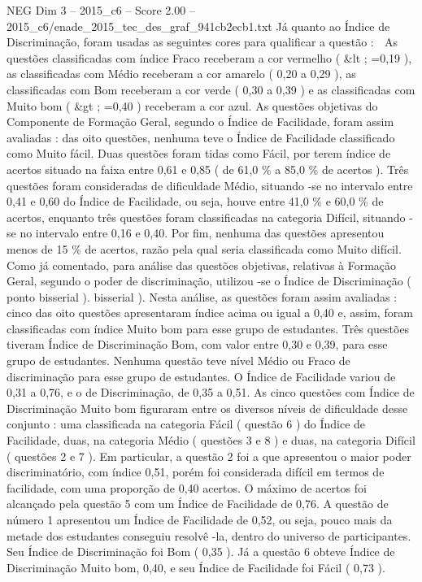 \begin{textsample}{NEG Dim 3 – 2015\_c6 – Score 2.00 – 2015\_c6/enade\_2015\_tec\_des\_graf\_941cb2ecb1.txt}
Já quanto ao Índice de Discriminação, foram usadas as seguintes cores para qualificar a questão :  As questões classificadas com índice Fraco receberam a cor vermelho ( \&lt ; =0,19 ), as classificadas com Médio receberam a cor amarelo ( 0,20 a 0,29 ), as classificadas com Bom receberam a cor verde ( 0,30 a 0,39 ) e as classificadas com Muito bom ( \&gt ; =0,40 ) receberam a cor azul.
As questões objetivas do Componente de Formação Geral, segundo o Índice de Facilidade, foram assim avaliadas : das oito questões, nenhuma teve o Índice de Facilidade classificado como Muito fácil.
Duas questões foram tidas como Fácil, por terem índice de acertos situado na faixa entre 0,61 e 0,85 ( de 61,0 \% a 85,0 \% de acertos ).
Três questões foram consideradas de dificuldade Médio, situando -se no intervalo entre 0,41 e 0,60 do Índice de Facilidade, ou seja, houve entre 41,0 \% e 60,0 \% de acertos, enquanto três questões foram classificadas na categoria Difícil, situando -se no intervalo entre 0,16 e 0,40.
Por fim, nenhuma das questões apresentou menos de 15 \% de acertos, razão pela qual seria classificada como Muito difícil.
Como já comentado, para análise das questões objetivas, relativas à Formação Geral, segundo o poder de discriminação, utilizou -se o Índice de Discriminação ( ponto bisserial ). bisserial ).
Nesta análise, as questões foram assim avaliadas : cinco das oito questões apresentaram índice acima ou igual a 0,40 e, assim, foram classificadas com índice Muito bom para esse grupo de estudantes.
Três questões tiveram Índice de Discriminação Bom, com valor entre 0,30 e 0,39, para esse grupo de estudantes.
Nenhuma questão teve nível Médio ou Fraco de discriminação para esse grupo de estudantes.
O Índice de Facilidade variou de 0,31 a 0,76, e o de Discriminação, de 0,35 a 0,51.
As cinco questões com Índice de Discriminação Muito bom figuraram entre os diversos níveis de dificuldade desse conjunto : uma classificada na categoria Fácil ( questão 6 ) do Índice de Facilidade, duas, na categoria Médio ( questões 3 e 8 ) e duas, na categoria Difícil ( questões 2 e 7 ).
Em particular, a questão 2 foi a que apresentou o maior poder discriminatório, com índice 0,51, porém foi considerada difícil em termos de facilidade, com uma proporção de 0,40 acertos.
O máximo de acertos foi alcançado pela questão 5 com um Índice de Facilidade de 0,76.
A questão de número 1 apresentou um Índice de Facilidade de 0,52, ou seja, pouco mais da metade dos estudantes conseguiu resolvê -la, dentro do universo de participantes.
Seu Índice de Discriminação foi Bom ( 0,35 ).
Já a questão 6 obteve Índice de Discriminação Muito bom, 0,40, e seu Índice de Facilidade foi Fácil ( 0,73 ).

\end{textsample}
